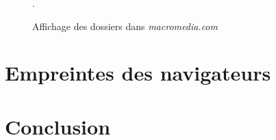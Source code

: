 \begin{figure}[h]
	\centering
	
	\caption{\label{ls_macromedia.com}Affichage des dossiers dans \textit{macromedia.com}}.
\end{figure}

\section{Empreintes des navigateurs}
\label{fingerprinters}



\section{Conclusion}

